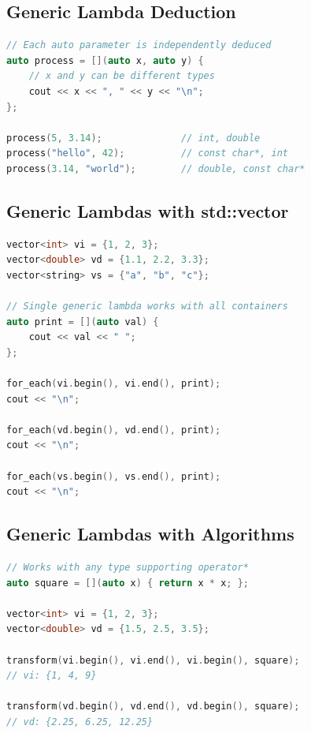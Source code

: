 \hypertarget{generic-lambda-deduction}{%
\subsection{Generic Lambda Deduction}\label{generic-lambda-deduction}}

\begin{lstlisting}[language={C++}]
// Each auto parameter is independently deduced
auto process = [](auto x, auto y) {
    // x and y can be different types
    cout << x << ", " << y << "\n";
};

process(5, 3.14);              // int, double
process("hello", 42);          // const char*, int
process(3.14, "world");        // double, const char*
\end{lstlisting}

\hypertarget{generic-lambdas-with-stdvector}{%
\subsection{Generic Lambdas with
std::vector}\label{generic-lambdas-with-stdvector}}

\begin{lstlisting}[language={C++}]
vector<int> vi = {1, 2, 3};
vector<double> vd = {1.1, 2.2, 3.3};
vector<string> vs = {"a", "b", "c"};

// Single generic lambda works with all containers
auto print = [](auto val) {
    cout << val << " ";
};

for_each(vi.begin(), vi.end(), print);
cout << "\n";

for_each(vd.begin(), vd.end(), print);
cout << "\n";

for_each(vs.begin(), vs.end(), print);
cout << "\n";
\end{lstlisting}

\hypertarget{generic-lambdas-with-algorithms}{%
\subsection{Generic Lambdas with
Algorithms}\label{generic-lambdas-with-algorithms}}

\begin{lstlisting}[language={C++}]
// Works with any type supporting operator*
auto square = [](auto x) { return x * x; };

vector<int> vi = {1, 2, 3};
vector<double> vd = {1.5, 2.5, 3.5};

transform(vi.begin(), vi.end(), vi.begin(), square);
// vi: {1, 4, 9}

transform(vd.begin(), vd.end(), vd.begin(), square);
// vd: {2.25, 6.25, 12.25}
\end{lstlisting}

